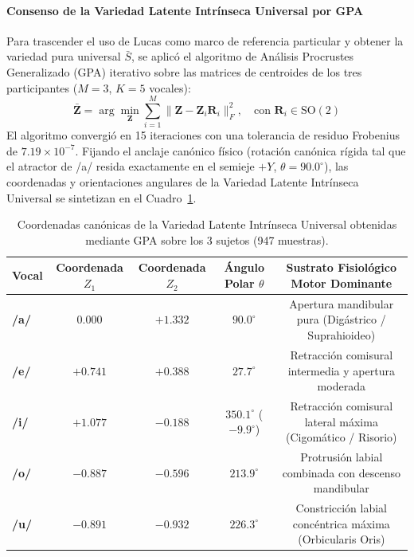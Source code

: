 \documentclass[11pt,a4paper]{article}
\begin{document}
\paragraph{Consenso de la Variedad Latente Intrínseca Universal por GPA}
Para trascender el uso de Lucas como marco de referencia particular y obtener la variedad pura universal $\bar{S}$, se aplicó el algoritmo de Análisis Procrustes Generalizado (GPA) iterativo sobre las matrices de centroides de los tres participantes ($M=3$, $K=5$ vocales):
\begin{equation}
\bar{\mathbf{Z}} = \arg\min_{\mathbf{Z}} \sum_{i=1}^M \|\mathbf{Z} - \mathbf{Z}_i \mathbf{R}_i\|_F^2, \quad \text{con } \mathbf{R}_i \in \text{SO}(2)
\end{equation}
El algoritmo convergió en 15 iteraciones con una tolerancia de residuo Frobenius de $7.19 \times 10^{-7}$. Fijando el anclaje canónico físico (rotación canónica rígida tal que el atractor de /a/ resida exactamente en el semieje $+Y$, $\theta = 90.0^\circ$), las coordenadas y orientaciones angulares de la Variedad Latente Intrínseca Universal se sintetizan en el Cuadro~\ref{tab:variedad_intrinseca_gpa}.

\begin{table}[H]
\centering
\small
\begin{tabular}{lcccc}
\toprule
\textbf{Vocal} & \textbf{Coordenada $Z_1$} & \textbf{Coordenada $Z_2$} & \textbf{Ángulo Polar $\theta$} & \textbf{Sustrato Fisiológico Motor Dominante} \\
\midrule
\textbf{/a/} & $0.000$ & $+1.332$ & $90.0^\circ$ & Apertura mandibular pura (Digástrico / Suprahioideo) \\
\textbf{/e/} & $+0.741$ & $+0.388$ & $27.7^\circ$ & Retracción comisural intermedia y apertura moderada \\
\textbf{/i/} & $+1.077$ & $-0.188$ & $350.1^\circ$ ($-9.9^\circ$) & Retracción comisural lateral máxima (Cigomático / Risorio) \\
\textbf{/o/} & $-0.887$ & $-0.596$ & $213.9^\circ$ & Protrusión labial combinada con descenso mandibular \\
\textbf{/u/} & $-0.891$ & $-0.932$ & $226.3^\circ$ & Constricción labial concéntrica máxima (Orbicularis Oris) \\
\bottomrule
\end{tabular}
\caption{Coordenadas canónicas de la Variedad Latente Intrínseca Universal obtenidas mediante GPA sobre los 3 sujetos (947 muestras).}
\label{tab:variedad_intrinseca_gpa}
\end{table}
\end{document}
